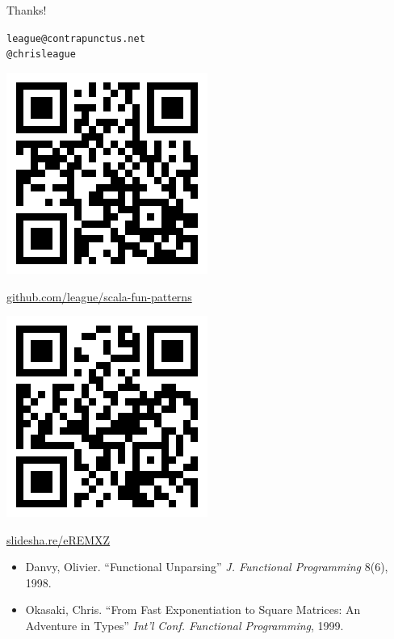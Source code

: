 \documentclass[14pt,t,usepdftitle=false,
xcolornames=x11names,svgnames,dvipsnames]{beamer}
\newcommand{\foreachFontA}[1]{
  #1{Adobe Caslon Pro} #1{Adobe Garamond Pro} #1{Adobe Jenson Pro}
  #1{Arno Pro}         #1{Bell Gothic Std}    #1{Century Old Style Std}
  #1{Chaparral Pro}    #1{Conga Brava Std}}
\newcommand{\foreachFontB}[1]{
  #1{Cronos Pro}       #1{Garamond Premier Pro} #1{Immi Five O Five Std}
  #1{Minion Pro}       #1{Myriad Pro}           #1{Nueva Std}
  #1{Tekton Pro}       #1{Warnock Pro}}
\newcommand{\foreachFontM}[1]{
  #1{Inconsolata} #1{Letter Gothic Std} #1{Prestige Elite Std}}
\newcommand{\fontSampleF}[3]{
  #1 #3 123abcgyqz fi fl ffi \textbf{bold} \textit{italic}
  #2 123\\}
\newcommand{\fontSample}[1]{
  \fontSampleF{\fontspec{#1}}{\fontspec[Numbers={OldStyle}]{#1}}{#1}}
\newcommand{\fontSamples}{      %
  \frame{\foreachFontA{\fontSample}}
  \frame{\foreachFontB{\fontSample}}
  \frame{\fontfamily{lmtt}\selectfont
    \fontSampleF{\relax}{\relax}{Computer Modern Typewriter}
    \foreachFontM{\fontSample}}}
\begin{document}
\begin{frame}{Thanks!}
  \vspace*{-8mm}
  \begin{center}
      \texttt{league@contrapunctus.net}\\
      \texttt{@chrisleague}
  \end{center}
  \vspace*{-6mm}
  {\begin{minipage}[t]{.45\linewidth}\centering
      \includegraphics[scale=.33]{github-qr.png}
      
      \url{github.com/league/scala-fun-patterns}
    \end{minipage}}
  \hfill
  {\begin{minipage}[t]{.45\linewidth}\centering
      \includegraphics[scale=.33]{slideshare-qr.png}
      
      \url{slidesha.re/eREMXZ}
    \end{minipage}}\medskip\small

  \begin{itemize}
  \item Danvy, Olivier. ``Functional Unparsing'' \textit{J.
      Functional Programming} 8(6), 1998.
  \item Okasaki, Chris. ``From Fast Exponentiation to Square Matrices:
    An Adventure in Types'' \textit{Int'l Conf. Functional
      Programming}, 1999.
  \end{itemize}
\end{frame}
\end{document}
